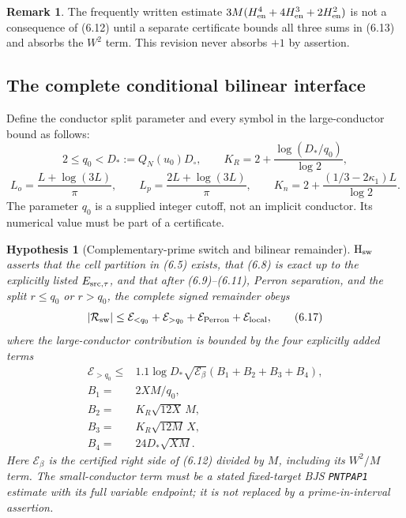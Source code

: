 \documentclass[11pt]{article}
\newtheorem{hypothesis}[theorem]{Hypothesis}
\theoremstyle{definition}
\newtheorem{remark}[theorem]{Remark}
\begin{document}
\begin{remark}
The frequently written estimate
\(3M(H_{\rm en}^4+4H_{\rm en}^3+2H_{\rm en}^2)\) is not a consequence of
(6.12) until a separate certificate bounds all three sums in (6.13) and
absorbs the \(W^2\) term.  This revision never absorbs \(+1\) by assertion.
\end{remark}

\subsection{The complete conditional bilinear interface}
\label{sec:bilinear}

Define the conductor split parameter and every symbol in the large-conductor
bound as follows:
\[
 2\le q_0<D_*:=Q_N(u_0)D_\circ,\qquad
 K_R=2+\frac{\log(D_*/q_0)}{\log2},
\tag{6.15}
\]
\[
 L_o=\frac{L+\log(3L)}{\pi},\qquad
 L_p=\frac{2L+\log(3L)}{\pi},\qquad
 K_n=2+\frac{(1/3-2\kappa_1)L}{\log2}.
\tag{6.16}
\]
The parameter \(q_0\) is a supplied integer cutoff, not an implicit
conductor.  Its numerical value must be part of a certificate.

\begin{hypothesis}[Complementary-prime switch and bilinear remainder]
\label{hyp:switch}
\(\mathrm{H}_{\rm sw}\) asserts that the cell partition in (6.5) exists,
that (6.8) is exact up to the explicitly listed \(E_{\rm src,\tau}\), and
that after (6.9)--(6.11), Perron separation, and the split
\(r\le q_0\) or \(r>q_0\), the complete signed remainder obeys
\[
 |\mathcal R_{\rm sw}|\le
 \mathcal E_{<q_0}+\mathcal E_{>q_0}
 +\mathcal E_{\rm Perron}+\mathcal E_{\rm local},
\tag{6.17}
\]
where the large-conductor contribution is bounded by the four explicitly
added terms
\[
\begin{aligned}
 \mathcal E_{>q_0}\le&
 1.1\log D_*\sqrt{\mathcal E_\beta}
 \left(B_1+B_2+B_3+B_4\right),\\
 B_1={}&2XM/q_0,\\
 B_2={}&K_R\sqrt{12X}\,M,\\
 B_3={}&K_R\sqrt{12M}\,X,\\
 B_4={}&24D_*\sqrt{XM}.
\end{aligned}
\tag{6.18}
\]
Here \(\mathcal E_\beta\) is the certified right side of (6.12) divided
by \(M\), including its \(W^2/M\) term.  The small-conductor term must
be a stated fixed-target BJS \texttt{PNTPAP1} estimate with its full
variable endpoint; it is not replaced by a prime-in-interval assertion.
\end{hypothesis}
\end{document}
